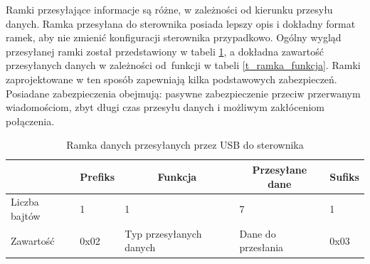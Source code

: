 Ramki przesyłające informacje są różne, w zależności od kierunku przesyłu danych. Ramka przesyłana do sterownika posiada lepszy opis i dokładny format ramek, aby nie zmienić konfiguracji sterownika przypadkowo. Ogólny wygląd przesyłanej ramki został przedstawiony w tabeli \ref{t_ramka_ogolna}, a dokładna zawartość przesyłanych danych w zależności od~funkcji w tabeli \ref{t_ramka_funkcja}. Ramki zaprojektowane w ten sposób zapewniają kilka podstawowych zabezpieczeń. Posiadane zabezpieczenia obejmują: pasywne zabezpieczenie przeciw przerwanym wiadomościom, zbyt długi czas przesyłu danych i możliwym zakłóceniom połączenia.

\begin{table}[!h]
\centering
\caption{Ramka danych przesyłanych przez USB do sterownika}
\begin{tabular}{|l|l|l|l|l|}
\hline
            & \multicolumn{1}{|c|}{Prefiks} & \multicolumn{1}{|c|}{Funkcja}                 & \multicolumn{1}{|c|}{Przesyłane dane}    & \multicolumn{1}{|c|}{Sufiks} \\ \hline
Liczba bajtów & 1      & 1                       & 7                  & 1      \\ \hline
Zawartość   & 0x02   & Typ przesyłanych danych & Dane do przesłania & 0x03   \\ \hline
\end{tabular}
\label{t_ramka_ogolna}
\end{table}

